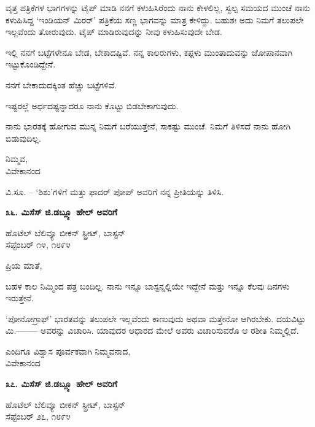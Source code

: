 ವೃತ್ತ ಪತ್ರಿಕೆಗಳ ಭಾಗಗಳನ್ನು ಟೈಪ್ ಮಾಡಿ ನನಗೆ ಕಳುಹಿಸಿರೆಂದು ನಾನು ಕೇಳಲಿಲ್ಲ, ಸ್ವಲ್ಪ ಸಮಯದ ಮುಂಚೆ ನಾನು ಕಳುಹಿಸಿದ್ದ ‘ಇಂಡಿಯನ್ ಮಿರರ್’ ಪತ್ರಿಕೆಯ ಸಣ್ಣ ಭಾಗವನ್ನು ಮಾತ್ರ ಕೇಳಿದ್ದು. ಬಹುಶಃ ಅದು ನಿಮಗೆ ತಲುಪಲೇ ಇಲ್ಲವೆಂದು ತೋರುವುದು. ಟೈಪ್ ಮಾಡಿರುವುದನ್ನು ನೀವು ಕಳುಹಿಸುವುದೇ ಬೇಡ.

ಇಲ್ಲಿ ನನಗೆ ಬಟ್ಟೆಗಳೇನೂ ಬೇಡ, ಬೇಕಾದಷ್ಟಿವೆ. ನನ್ನ ಕಾಲರುಗಳು, ಕಫ್ಗಳು ಮುಂತಾದುವನ್ನು ಜೋಪಾನವಾಗಿ ಇಟ್ಟುಕೊಂಡಿದ್ದೇನೆ.

ನನಗೆ ಬೇಕಾದುದಕ್ಕಿಂತ ಹೆಚ್ಚು ಬಟ್ಟೆಗಳಿವೆ.

ಇಷ್ಟರಲ್ಲೆ ಅರ್ಧದಷ್ಟನ್ನಾದರೂ ನಾನು ಕೊಟ್ಟು ಬಿಡಬೇಕಾಗುವುದು.

ನಾನು ಭಾರತಕ್ಕೆ ಹೋಗುವ ಮುನ್ನ ನಿಮಗೆ ಬರೆಯುತ್ತೇನೆ, ಸಾಕಷ್ಟು ಮುಂಚೆ. ನಿಮಗೆ ತಿಳಿಸದೆ ನಾನು ಹೋಗಿ ಬಿಡುವುದಿಲ್ಲ.

\begin{flushright}
ನಿಮ್ಮವ,\\ವಿವೇಕಾನಂದ
\end{flushright}

ವಿ.ಸೂ. – ‘ಶಿಶು’ಗಳಿಗೆ ಮತ್ತು ಫಾದರ್ ಪೋಪ್ ಅವರಿಗೆ ನನ್ನ ಪ್ರೀತಿಯನ್ನು ತಿಳಿಸಿ.

\begin{center}
\textbf{೩೬. ಮಿಸೆಸ್ ಜಿ.ಡಬ್ಲ್ಯೂ ಹೇಲ್ ಅವರಿಗೆ}
\end{center}

\begin{flushright}
ಹೊಟೆಲ್ ಬೆಲಿವ್ಯೂ ಬೀಕನ್ ಸ್ಟ್ರೀಟ್, ಬಾಸ್ಟನ್\\ಸೆಪ್ಟೆಂಬರ್ ೧೪, ೧೮೯೪
\end{flushright}

ಪ್ರಿಯ ಮಾತೆ,

ಬಹಳ ಕಾಲ ನಿಮ್ಮಿಂದ ಪತ್ರ ಬಂದಿಲ್ಲ. ನಾನು ಇನ್ನೂ ಬಾಸ್ಟನ್ನಲ್ಲಿಯೇ ಇದ್ದೇನೆ ಮತ್ತು ಇನ್ನೂ ಕೆಲವು ದಿನಗಳು ಇರುತ್ತೇನೆ.

‘ಪೋನೋಗ್ರಾಫ್’ ಭಾರತವನ್ನು ತಲುಪಲೇ ಇಲ್ಲವೆಂದು ಕಾಣುವುದು ಅಥವಾ ಮತ್ತೇನೋ ಆಗಿರಬೇಕು. ದಯವಿಟ್ಟು ಮಿ.––––– ಅವರನ್ನು ವಿಚಾರಿಸಿ. ಯಾವುದರ ಆಧಾರದ ಮೇಲೆ ಅವರು ವಿಚಾರಿಸುವರೊ ಆ ರಶೀತಿ ನಿಮ್ಮಲ್ಲಿದೆ.

\begin{flushright}
ಎಂದಿಗೂ ವಿಶ್ವಾಸ ಪೂರ್ವಕವಾಗಿ ನಿಮ್ಮವನಾದ,\\ವಿವೇಕಾನಂದ
\end{flushright}

\begin{center}
\textbf{೩೭. ಮಿಸೆಸ್ ಜಿ.ಡಬ್ಲ್ಯೂ ಹೇಲ್ ಅವರಿಗೆ}
\end{center}

\begin{flushright}
ಹೊಟೆಲ್ ಬೆಲಿವ್ಯೂ ಬೀಕನ್ ಸ್ಟ್ರೀಟ್, ಬಾಸ್ಟನ್\\ಸೆಪ್ಟೆಂಬರ್ ೨೭, ೧೮೯೪
\end{flushright}

